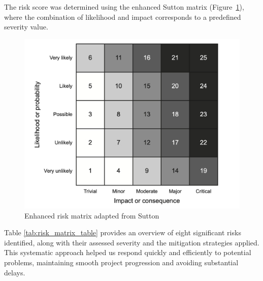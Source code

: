 The risk score was determined using the enhanced Sutton matrix (Figure~\ref{fig:risk_matrix}), where the combination of likelihood and impact corresponds to a predefined severity value.

\begin{figure}[H]
    \centering
    \includegraphics[width=0.70\linewidth]{figures/risk_matrix.png}
    \caption{Enhanced risk matrix adapted from Sutton \autocite[Figure 6.2]{Sutton2021}}
    \label{fig:risk_matrix}
\end{figure}

Table \ref{tab:risk_matrix_table} provides an overview of eight significant risks identified, along with their assessed severity and the mitigation strategies applied. This systematic approach helped us respond quickly and efficiently to potential problems, maintaining smooth project progression and avoiding substantial delays.

